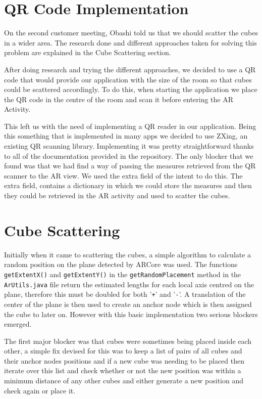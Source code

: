 \documentclass{l3proj}
\begin{document}
\section{QR Code Implementation}
On the second customer meeting, Obashi told us that we should scatter the
cubes in a wider area. The research done and different approaches taken
for solving this problem are explained in the Cube Scattering section. %

After doing research and trying the different approaches, we decided to
use a QR code that would provide our application with the size of
the room so that cubes could be scattered accordingly. To do this,
when starting the application we place the QR code in the centre of
the room and scan it before entering the AR Activity.

This left us with the need of implementing a QR reader in our application.
Being this something that is implemented in many apps we decided to use
ZXing\cite{ZXing}, an existing QR scanning library. Implementing it was
pretty straightforward thanks to all of the documentation provided in
the repository. The only blocker that we found was that we had find a
way of passing the measures retrieved from the QR scanner to the AR view.
We used the extra field of the intent to do this. The extra field,
contains a dictionary in which we could store the measures and then
they could be retrieved in the AR activity and used to scatter the
cubes.

\section{Cube Scattering}

Initially when it came to scattering the cubes, a simple algorithm to calculate a random position 
on the plane detected by ARCore was used. The functions \verb|getExtentX()| and \verb|getExtentY()| 
in the \verb|getRandomPlacement| method in the \verb|ArUtils.java| file return the estimated 
lengths for each local axis centred on the plane, therefore this must be doubled for both '\verb|+|' 
and '\verb|-|'\cite{getExtent}. A translation of the center of the plane is then used to create an anchor node which 
is then assigned the cube to later on. However with this basic implementation two serious blockers 
emerged.

The first major blocker was that cubes were sometimes being placed inside each other, a simple fix 
devised for this was to keep a list of pairs of all cubes and their anchor nodes positions and if 
a new cube was needing to be placed then iterate over this list and check whether or not the new 
position was within a minimum distance of any other cubes and either generate a new position and 
check again or place it.
\end{document}
